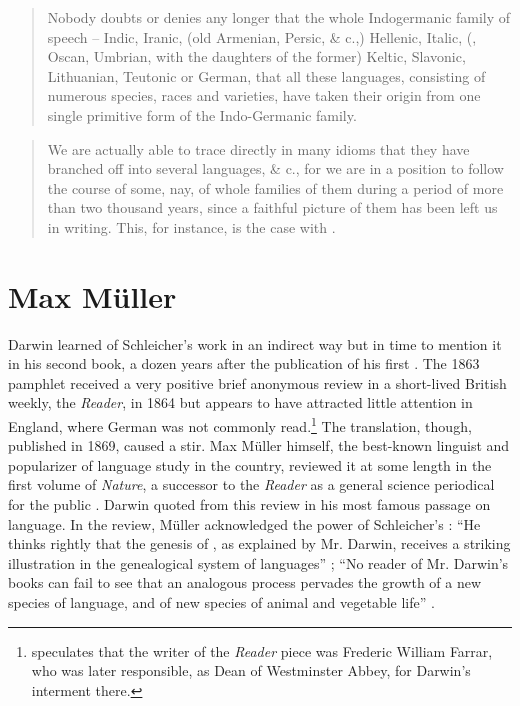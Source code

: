\documentclass[output=paper,
modfonts
]{LSP/langsci}
\begin{document}
\begin{quote}
Nobody doubts or denies any longer that the whole Indogermanic family of speech -- Indic, Iranic, (old Armenian, Persic, \& c.,) Hellenic, Italic, (, Oscan, Umbrian, with the daughters of the former) Keltic, Slavonic, Lithuanian, Teutonic or German, that all these languages, consisting of numerous species, races and varieties, have taken their origin from one single primitive form of the Indo-Germanic family. \citep[34]{Schleicher1863}
\end{quote}

\begin{quote}
We are actually able to trace directly in many idioms that they have branched off into several languages,  \& c., for we are in a position to follow the course of some, nay, of whole families of them during a period of more than two thousand years, since a faithful picture of them has been left us in writing. This, for instance, is the case with . \citep[41--42]{Schleicher1863}
\end{quote}

\section{Max Müller}

Darwin learned of Schleicher's work in an indirect way but in time to mention it in his second book, a dozen years after the publication of his first \citep{Darwin1871}. The 1863 pamphlet received a very positive brief anonymous review in a short-lived British weekly, the \textit{Reader}, in 1864 but appears to have attracted little attention in England, where German was not commonly read.\footnote{ \citet{alter1999} speculates that the writer of the \textit{Reader} piece was Frederic William Farrar, who was later responsible, as Dean of Westminster Abbey, for Darwin's interment there.} The  translation, though, published in 1869, caused a stir. Max Müller himself, the best-known linguist and popularizer of language study in the country, reviewed it at some length in the first volume of \textit{Nature}, a successor to the \textit{Reader} as a general science periodical for the public \citep{muller1870}.  Darwin quoted from this review in his most famous passage on language.  In the review, Müller acknowledged the power of Schleicher's : ``He thinks rightly that the genesis of , as explained by Mr. Darwin, receives a striking illustration in the genealogical system of languages'' \citep[257]{muller1870}; ``No reader of Mr. Darwin's books can fail to see that an analogous process pervades the growth of a new species of language, and of new species of animal and vegetable life'' \citep[258]{muller1870}.
\end{document}
